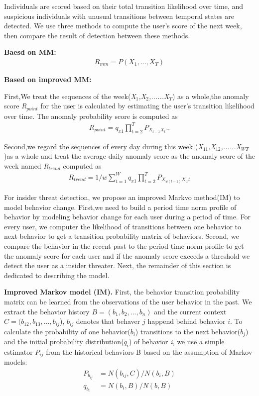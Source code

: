 \documentclass[conference]{IEEEtran}
\begin{document}
Individuals are scored based on their total transition likelihood over time, and suspicious individuals with unusual transitions between temporal states are detected. We use three methods to compute the user’s score of the next week, then compare the result of detection between these methods.

\textbf{Baesd on MM:}
\begin{align}
R_{mm} = P(X_1,...,X_T)
\end{align}


\textbf{Based on improved MM:}

First,We treat the sequences of the week(\emph{X$_1$,X$_2$,......X$_T$}) as a whole,the anomaly score \emph{R$_{point}$} for the user is calculated by estimating the user’s transition likelihood over time. The anomaly probability score is computed as
\begin{align}
R_{point}=q_{x1}\prod_{t=2}^T P_{X_{t-1}X_t}..
\end{align}

Second,we regard the sequences of every day during this week (\emph{X$_{11}$,X$_{12}$,......X$_{WT}$})as a whole and treat the average daily anomaly score as the anomaly score of the week named \emph{R$_{trend}$} computed as 
\begin{align}
R_{trend}=1/w\sum_{t=1}^W {q_{x1}\prod_{t=2}^T P_{X_{w(t-1)}X_wt}}
\end{align}

\fi
 
For insider threat detection, we propose an improved Markvo method(IM) to model behavior change. First,we need to build a period time norm profile of behavior by modeling behavior change for each user during a period of time. For every user, we computer the likelihood of transitions between one behavior to next behavior to get a transition probability matrix of behaviors. 
Second, we compare the behavior in the recent past to
the period-time norm profile to get the anomaly score for each user and if the anomaly score exceeds a threshold we detect the user as a insider threater. 
Next, the remainder of this section is dedicated to describing the model.


\textbf{Improved Markov model (IM).}
First, the behavior transition probability matrix can be learned from the observations of the user behavior in the past. 
We extract the behavior history
$B=(b_1, b_2, ..., b_n)$ and the current context $C = (b_{12},b_{13},..., b_{ij}$), $b_{ij}$ denotes that behaver $j$ happend behind behavior $i$. 
To calculate the probability of one behavior($b_i$) transitions to the next behavior($b_j$) and the initial probability distribution(\emph{$q_i$}) of behavior \emph{i}, 
we use a simple estimator $P_{ij}$ from the historical behaviors B based on the assumption of Markov models\cite{b47}:
\begin{align}
P_{b_{ij}}&=N(b_{ij},C)/N(b_i,B)\\
q_{b_i}&=N({b_i},B)/N(b,B)
\end{align}
\end{document}
